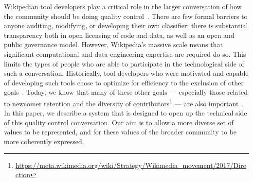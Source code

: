 Wikipedian tool developers play a critical role in the larger conversation of how the community should be doing quality control~\cite{geiger2014bots, halfaker2014snuggle}. There are few formal barriers to anyone auditing, modifying, or developing their own classifier: there is substantial transparency both in open licensing of code and data, as well as an open and public governance model. However, Wikipedia's massive scale means that significant computational and data engineering expertise are required do so. This limits the types of people who are able to participate in the technological side of such a conversation.  Historically, tool developers who were motivated and capable of developing such tools chose to optimize for efficiency to the exclusion of other goals~\cite{halfaker2014snuggle}.  Today, we know that many of these other goals --- especially those related to newcomer retention and the diversity of contributors\footnote{\url{https://meta.wikimedia.org/wiki/Strategy/Wikimedia_movement/2017/Direction}} --- are also important~\cite{morgan2013tea, halfaker2013rise}.  In this paper, we describe a system that is designed to open up the technical side of this quality control conversation. Our aim is to allow a more diverse set of values to be represented, and for these values of the broader community to be more coherently expressed.